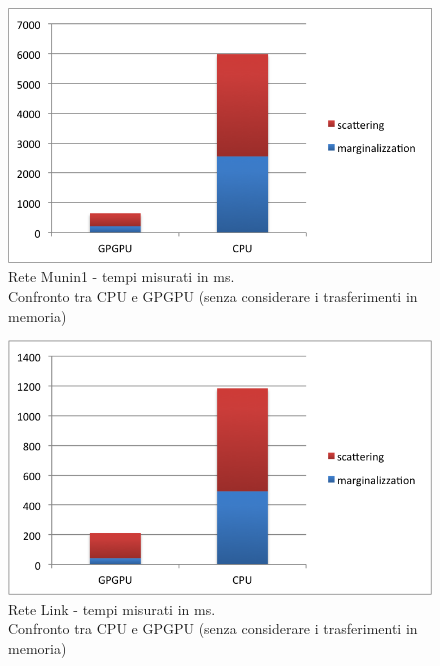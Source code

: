 \documentclass[a4paper]{article}   %
\begin{document}
\begin{figure}[p]
\centering
\includegraphics[scale=0.8]{Munin1.png}
\caption{Rete Munin1 - tempi misurati in ms.\\Confronto tra CPU e GPGPU (senza considerare i trasferimenti in memoria)} 
\label{graficoMunin1}
\end{figure}

\begin{figure}[p]
\centering
\includegraphics[scale=0.8]{Link.png}
\caption{Rete Link - tempi misurati in ms.\\Confronto tra CPU e GPGPU (senza considerare i trasferimenti in memoria)} 
\label{graficoLink}
\end{figure}

\printbibliography
\end{document}

